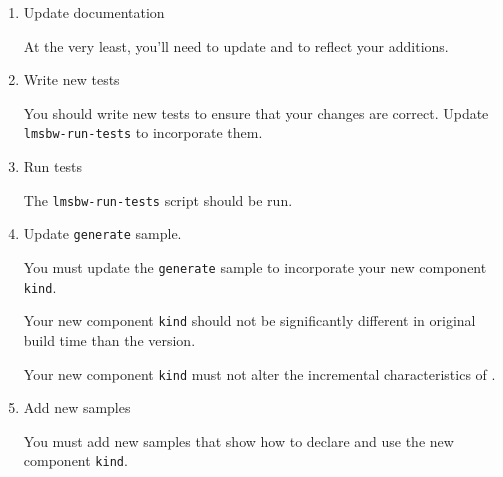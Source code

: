 \begin{enumerate}
\item Update documentation

  At the very least, you'll need to update  and
   to reflect your additions.

\item Write new tests

  You should write new tests to ensure that your changes are correct.
  Update \texttt{lmsbw-run-tests} to incorporate them.

\item Run tests

  The \texttt{lmsbw-run-tests} script should be run.

\item Update \texttt{generate} sample.

  You must update the \texttt{generate} sample to incorporate your
  new component \texttt{kind}.

  Your new component \texttt{kind} should not be significantly
  different in original build time than the \makefile version.

  Your new component \texttt{kind} must not alter the incremental
  characteristics of \lmsbw.

\item Add new samples

  You must add new samples that show how to declare and use the new
  component \texttt{kind}.

\end{enumerate}

